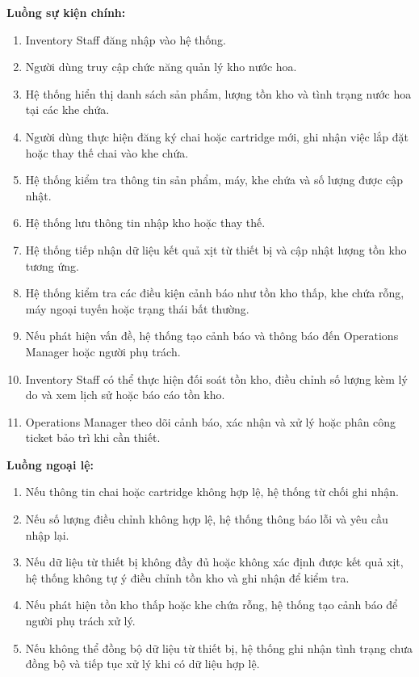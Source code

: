 \textbf{Luồng sự kiện chính:}
\begin{enumerate}
    \item Inventory Staff đăng nhập vào hệ thống.
    \item Người dùng truy cập chức năng quản lý kho nước hoa.
    \item Hệ thống hiển thị danh sách sản phẩm, lượng tồn kho và tình trạng nước hoa tại các khe chứa.
    \item Người dùng thực hiện đăng ký chai hoặc cartridge mới, ghi nhận việc lắp đặt hoặc thay thế chai vào khe chứa.
    \item Hệ thống kiểm tra thông tin sản phẩm, máy, khe chứa và số lượng được cập nhật.
    \item Hệ thống lưu thông tin nhập kho hoặc thay thế.
    \item Hệ thống tiếp nhận dữ liệu kết quả xịt từ thiết bị và cập nhật lượng tồn kho tương ứng.
    \item Hệ thống kiểm tra các điều kiện cảnh báo như tồn kho thấp, khe chứa rỗng, máy ngoại tuyến hoặc trạng thái bất thường.
    \item Nếu phát hiện vấn đề, hệ thống tạo cảnh báo và thông báo đến Operations Manager hoặc người phụ trách.
    \item Inventory Staff có thể thực hiện đối soát tồn kho, điều chỉnh số lượng kèm lý do và xem lịch sử hoặc báo cáo tồn kho.
    \item Operations Manager theo dõi cảnh báo, xác nhận và xử lý hoặc phân công ticket bảo trì khi cần thiết.
\end{enumerate}

\textbf{Luồng ngoại lệ:}
\begin{enumerate}[label=\arabic{enumi}a*.]
    \item Nếu thông tin chai hoặc cartridge không hợp lệ, hệ thống từ chối ghi nhận.
    \item Nếu số lượng điều chỉnh không hợp lệ, hệ thống thông báo lỗi và yêu cầu nhập lại.
    \item Nếu dữ liệu từ thiết bị không đầy đủ hoặc không xác định được kết quả xịt, hệ thống không tự ý điều chỉnh tồn kho và ghi nhận để kiểm tra.
    \item Nếu phát hiện tồn kho thấp hoặc khe chứa rỗng, hệ thống tạo cảnh báo để người phụ trách xử lý.
    \item Nếu không thể đồng bộ dữ liệu từ thiết bị, hệ thống ghi nhận tình trạng chưa đồng bộ và tiếp tục xử lý khi có dữ liệu hợp lệ.
\end{enumerate}

